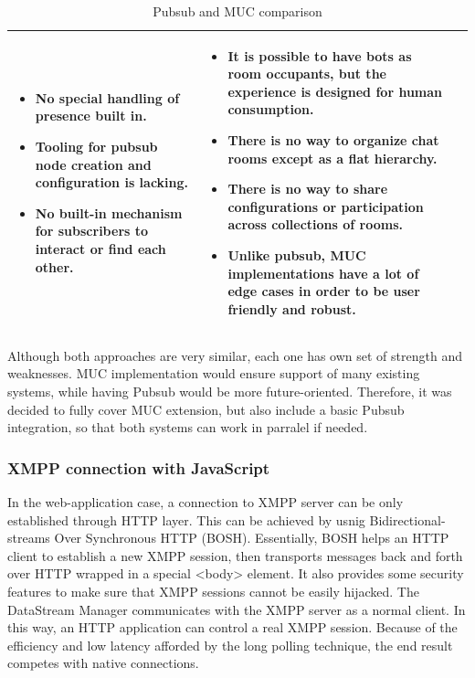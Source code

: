 \begin{table}[H]
\begin{tabular}{|L{0.5cm}|L{7.5cm}|L{7.5cm}|}
\begin{itemize}
		\item No special handling of presence built in. 
		\item Tooling for pubsub node creation and configuration is lacking. 
		\item No built-in mechanism for subscribers to interact or find each other. 
		\end{itemize}
	& \begin{itemize}
		\item It is possible to have bots as room occupants, but the experience is designed for human consumption. 
		\item There is no way to organize chat rooms except as a flat hierarchy.
		\item There is no way to share configurations or participation across collections of rooms.
		\item Unlike pubsub, MUC implementations have a lot of edge cases in order to be user friendly and robust.
		\end{itemize}\\
	\hline
	\end{tabular}
	\caption[Pubsub and MUC comparison]{Pubsub and MUC comparison}
	\label{tab:muc_vs_pubsub}
	\end{table}

Although both approaches are very similar, each one has own set of strength and weaknesses. MUC implementation would ensure support of many existing systems, while having Pubsub would be more future-oriented. Therefore, it was decided to fully cover MUC extension, but also include a basic Pubsub integration, so that both systems can work in parralel if needed.

\subsubsection{XMPP connection with JavaScript}
In the web-application case, a connection to XMPP server can be only established through HTTP layer. This can be achieved by usnig Bidirectional-streams Over Synchronous HTTP (BOSH). Essentially, BOSH helps an HTTP client to establish a new XMPP session, then transports messages back and forth over HTTP wrapped in a special <body> element. It also provides some security features to make sure that XMPP sessions cannot be easily hijacked. The DataStream Manager communicates with the XMPP server as a normal client. In this way, an HTTP application can control a real XMPP session. Because of the efficiency and low latency afforded by the long polling technique, the end result competes with native connections.

